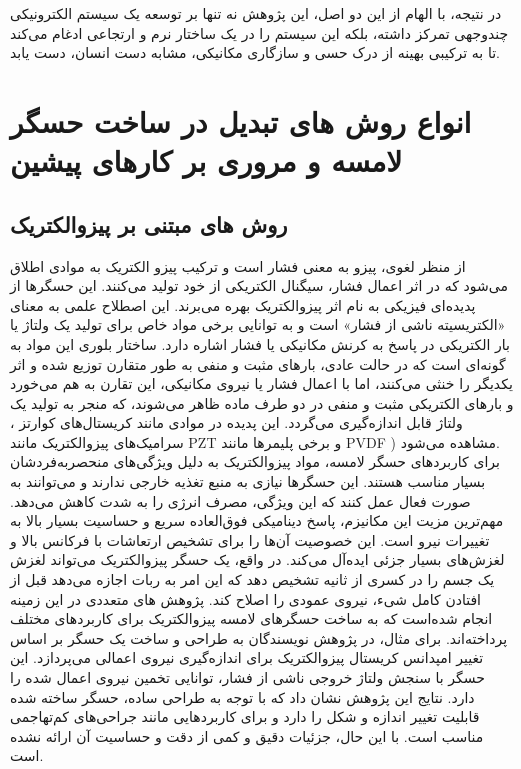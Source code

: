 در نتیجه، با الهام از این دو اصل، این  پژوهش نه تنها بر توسعه یک سیستم الکترونیکی چندوجهی تمرکز داشته، بلکه این سیستم را در یک ساختار نرم و ارتجاعی ادغام می‌کند تا به ترکیبی بهینه از درک حسی و سازگاری مکانیکی، مشابه دست انسان، دست یابد.

\section{انواع روش های تبدیل در ساخت حسگر لامسه و مروری بر کار‌های پیشین}
\subsection{روش های مبتنی بر پیزوالکتریک}

از منظر لغوی، پیزو به معنی فشار است و ترکیب پیزو الکتریک
 به موادی اطلاق می‌شود که در اثر اعمال فشار، سیگنال الکتریکی از خود تولید می‌کنند. این حسگر‌ها از پدیده‌ای فیزیکی به نام اثر پیزوالکتریک بهره می‌برند. این اصطلاح علمی به معنای «الکتریسیته ناشی از فشار» است و به توانایی برخی مواد خاص برای تولید یک ولتاژ یا بار الکتریکی در پاسخ به کرنش مکانیکی یا فشار اشاره دارد. ساختار بلوری این مواد به گونه‌ای است که در حالت عادی، بارهای مثبت و منفی به طور متقارن توزیع شده و اثر یکدیگر را خنثی می‌کنند، اما با اعمال فشار یا نیروی مکانیکی، این تقارن به هم می‌خورد و بارهای الکتریکی مثبت و منفی در دو طرف ماده ظاهر می‌شوند، که منجر به تولید یک ولتاژ قابل اندازه‌گیری می‌گردد. این پدیده در موادی مانند کریستال‌های کوارتز 
،
 سرامیک‌های پیزوالکتریک مانند PZT
  و برخی پلیمرها مانند PVDF
 ) مشاهده می‌شود.
\\
برای کاربردهای حسگر لامسه، مواد پیزوالکتریک به دلیل ویژگی‌های منحصربه‌فردشان بسیار مناسب هستند. این حسگرها نیازی به منبع تغذیه خارجی ندارند و می‌توانند به صورت فعال
 عمل کنند که این ویژگی، مصرف انرژی را به شدت کاهش می‌دهد. مهم‌ترین مزیت این مکانیزم، پاسخ دینامیکی فوق‌العاده سریع و حساسیت بسیار بالا به تغییرات نیرو است. این خصوصیت آن‌ها را برای تشخیص ارتعاشات با فرکانس بالا و لغزش‌های بسیار جزئی
 ایده‌آل می‌کند. در واقع، یک حسگر پیزوالکتریک می‌تواند لغزش یک جسم را در کسری از ثانیه تشخیص دهد که این امر به ربات اجازه می‌دهد قبل از افتادن کامل شیء، نیروی عمودی را اصلاح کند. پژوهش های متعددی در این زمینه انجام شده‌است که به ساخت حسگرهای لامسه پیزوالکتریک برای کاربردهای مختلف پرداخته‌اند. برای مثال، در پژوهش 
\cite{nasserii2011Piezo}
  نویسندگان به طراحی و ساخت یک حسگر بر اساس تغییر امپدانس کریستال پیزوالکتریک برای اندازه‌گیری نیروی اعمالی می‌پردازد. این حسگر با سنجش ولتاژ خروجی ناشی از فشار، توانایی تخمین نیروی اعمال شده را دارد. نتایج این پژوهش نشان داد که با توجه به طراحی ساده، حسگر ساخته شده قابلیت تغییر اندازه و شکل را دارد و برای کاربردهایی مانند جراحی‌های کم‌تهاجمی مناسب است. با این حال، جزئیات دقیق و کمی از دقت و حساسیت آن ارائه نشده است.
